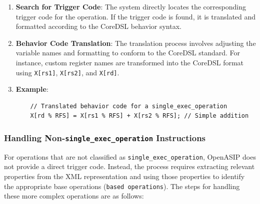 \begin{enumerate}
    \item \textbf{Search for Trigger Code}: The system directly locates the corresponding trigger code for the operation. If the trigger code is found, it is translated and formatted according to the CoreDSL behavior syntax.

    \item \textbf{Behavior Code Translation}: The translation process involves adjusting the variable names and formatting to conform to the CoreDSL standard. For instance, custom register names are transformed into the CoreDSL format using \texttt{X[rs1]}, \texttt{X[rs2]}, and \texttt{X[rd]}.

    \item \textbf{Example}:
    \begin{lstlisting}
    // Translated behavior code for a single_exec_operation
    X[rd % RFS] = X[rs1 % RFS] + X[rs2 % RFS]; // Simple addition
    \end{lstlisting}
\end{enumerate}

\subsubsection{Handling Non-\texttt{single\_exec\_operation} Instructions}

For operations that are not classified as \texttt{single\_exec\_operation}, OpenASIP does not provide a direct trigger code. Instead, the process requires extracting relevant properties from the XML representation and using those properties to identify the appropriate base operations (\texttt{based operations}). The steps for handling these more complex operations are as follows:

